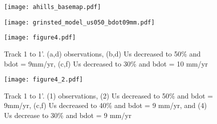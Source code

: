 \documentclass[11pt, oneside]{article}   	%
\begin{document}

\begin{figure}
	\centerline{\texttt{[image: ahills\_basemap.pdf]}}
\end{figure} 
\begin{figure}
	\centerline{\texttt{[image: grinsted\_model\_us050\_bdot09mm.pdf]}}
\end{figure}

\begin{figure}
	\centerline{\texttt{[image: figure4.pdf]}}
	\caption{Track 1 to 1'. (a,d) observations, (b,d) Us decreased to 50\% and bdot = 9mm/yr, (c,f) Us decreased to 30\% and bdot = 10 mm/yr}
\end{figure}

\begin{figure}
	\centerline{\texttt{[image: figure4\_2.pdf]}}
	\caption{Track 1 to 1'. (1) observations, (2) Us decreased to 50\% and bdot = 9mm/yr, (c,f) Us decreased to 40\% and bdot = 9 mm/yr, and (4) Us decrease to 30\% and bdot = 9 mm/yr}
\end{figure}
\end{document}
